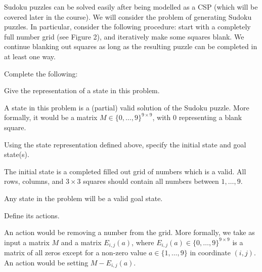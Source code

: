 \begin{enumerate}
    Sudoku puzzles can be solved easily after being modelled as a CSP (which will be covered later in the course). We will consider the problem of generating Sudoku puzzles. In particular, consider the following procedure: start with a completely full number grid (see Figure 2), and iteratively make some squares blank. We continue blanking out squares as long as the resulting puzzle can be completed in at least one way.

    Complete the following:

    \begin{listu}
        \item Give the representation of a state in this problem.

        \begin{solution}
            A state in this problem is a (partial) valid solution of the Sudoku puzzle. More formally, it would be a matrix $M \in \{ 0, \dots , 9 \}^{9\times9}$, with $0$ representing a blank square.
        \end{solution}

        \item Using the state representation defined above, specify the initial state and goal state(s).

        \begin{solution}
            \null

            \begin{listu}
                \item The initial state is a completed filled out grid of numbers which is a valid. All rows, columns, and $3 \times 3$ squares should contain all numbers between $1, \dots, 9$.
                \item Any state in the problem will be a valid goal state.
            \end{listu}
        \end{solution}

        \item Define its actions.

        \begin{solution}
            An action would be removing a number from the grid. More formally, we take as input a matrix $M$ and a matrix $E_{i,j}(a)$, where $E_{i,j}(a) \in \{ 0, \dots, 9 \}^{9 \times 9}$ is a matrix of all zeros except for a non-zero value $a \in \{ 1, \dots, 9 \}$ in coordinate $(i, j)$. An action would be setting $M - E_{i,j}(a)$.
        \end{solution}


\end{listu}
\end{enumerate}
